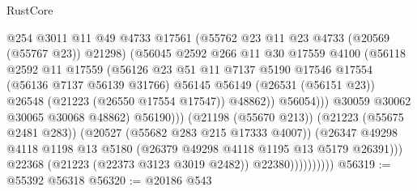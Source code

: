 \begin{lexlean}{RustCore}
\begin{coremodule}
                                      @254
                                      @3011
                                      @11
                                      @49
                                      @4733
                                      @17561
                                      (@55762 @23 @11 @23 @4733 (@20569 (@55767 @23)) @21298)
                                      (@56045
                                        @2592
                                        @266
                                        @11
                                        @30
                                        @17559
                                        @4100
                                        (@56118
                                          @2592
                                          @11
                                          @17559
                                          (@56126
                                            @23
                                            @51
                                            @11
                                            @7137
                                            @5190
                                            @17546
                                            @17554
                                            (@56136 @7137 @56139 @31766)
                                            @56145
                                            @56149
                                            (@26531 (@56151 @23))
                                            @26548
                                            (@21223 (@26550 @17554 @17547))
                                            @48862))
                                        @56054)))
                                  @30059
                                  @30062
                                  @30065
                                  @30068
                                  @48862)
                                @56190)))
                          (@21198 (@55670 @213))
                          (@21223 (@55675 @2481 @283))
                          (@20527 (@55682 @283 @215 @17333 @4007))
                          (@26347
                            @49298
                            @4118
                            @1198
                            @13
                            @5180
                            (@26379 @49298 @4118 @1195 @13 @5179 @26391)))
                        @22368
                        (@21223 (@22373 @3123 @3019 @2482))
                        @22380))))))))))
@56319 := @55392 @56318
@56320 := @20186 @543

\end{coremodule}
\end{lexlean}

